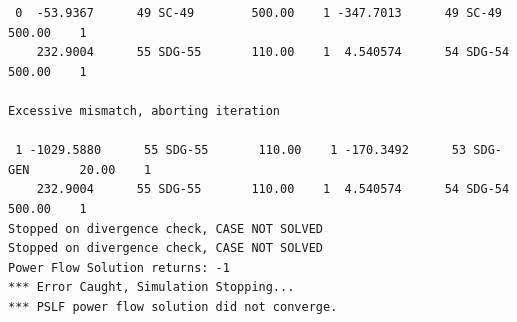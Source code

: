 \documentclass[12pt]{article}
\begin{document}
\begin{Verbatim}
 0  -53.9367      49 SC-49        500.00    1 -347.7013      49 SC-49        500.00    1
    232.9004      55 SDG-55       110.00    1  4.540574      54 SDG-54       500.00    1

Excessive mismatch, aborting iteration

 1 -1029.5880      55 SDG-55       110.00    1 -170.3492      53 SDG-GEN       20.00    1
    232.9004      55 SDG-55       110.00    1  4.540574      54 SDG-54       500.00    1
Stopped on divergence check, CASE NOT SOLVED
Stopped on divergence check, CASE NOT SOLVED
Power Flow Solution returns: -1
*** Error Caught, Simulation Stopping...
*** PSLF power flow solution did not converge.
\end{Verbatim}
\end{document}
